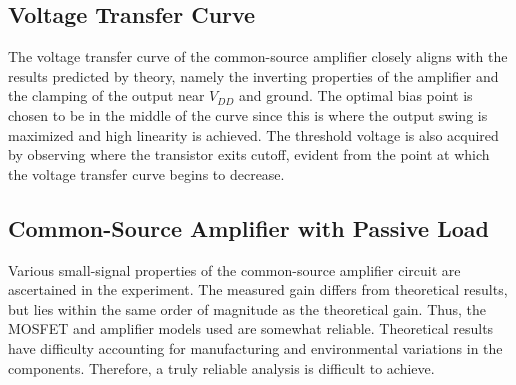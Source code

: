 \FloatBarrier

\subsection{Voltage Transfer Curve}

\FloatBarrier

The voltage transfer curve of the common-source amplifier closely aligns with the results predicted by theory, namely the inverting properties of the amplifier and the clamping of the output near $V_{DD}$ and ground. The optimal bias point is chosen to be in the middle of the curve since this is where the output swing is maximized and high linearity is achieved. The threshold voltage is also acquired by observing where the transistor exits cutoff, evident from the point at which the voltage transfer curve begins to decrease.

\FloatBarrier

\subsection{Common-Source Amplifier with Passive Load}

\FloatBarrier

Various small-signal properties of the common-source amplifier circuit are ascertained in the experiment. The measured gain differs from theoretical results, but lies within the same order of magnitude as the theoretical gain. Thus, the MOSFET and amplifier models used are somewhat reliable. Theoretical results have difficulty accounting for manufacturing and environmental variations in the components. Therefore, a truly reliable analysis is difficult to achieve.
